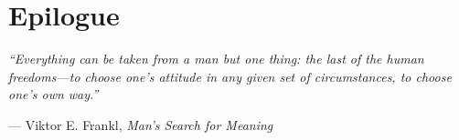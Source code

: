\chapter*{Epilogue}

\vspace{2cm}

\begin{center}
\large

\textit{``Everything can be taken from a man but one thing: the last of the human freedoms---to choose one's attitude in any given set of circumstances, to choose one's own way.''}

\vspace{1cm}

--- Viktor E. Frankl, \textit{Man's Search for Meaning}

\end{center}
